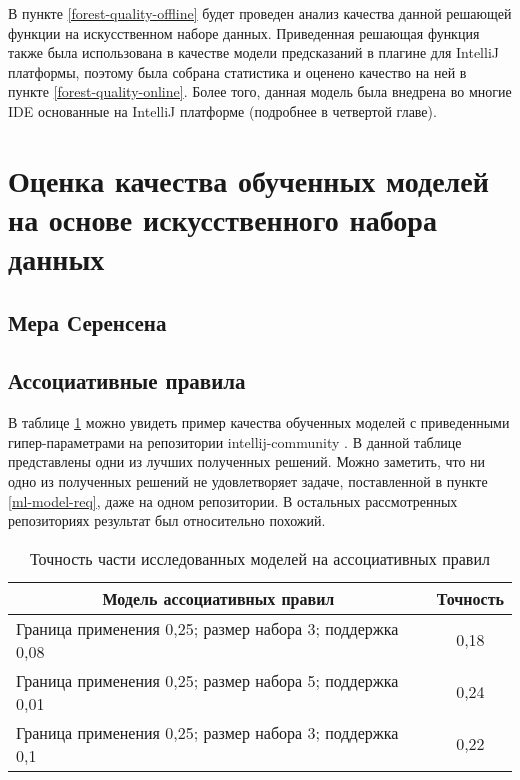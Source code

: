 В пункте \ref{forest-quality-offline} будет проведен анализ качества данной решающей функции на искусственном наборе данных. Приведенная решающая функция также была использована в качестве модели предсказаний в плагине для IntelliJ платформы, поэтому была собрана статистика и оценено качество на ней в пункте \ref{forest-quality-online}. Более того, данная модель была внедрена во многие IDE основанные на IntelliJ платформе (подробнее в четвертой главе).
\section{Оценка качества обученных моделей на основе искусственного набора данных}
    \subsection{Мера Серенсена}\label{coef-quality}
    \subsection{Ассоциативные правила}\label{rules-quality}
В таблице \ref{ar-offline-result-table} можно увидеть пример качества обученных моделей с приведенными гипер-параметрами на репозитории intellij-community \cite{ij-community}. В данной таблице представлены одни из лучших полученных решений. Можно заметить, что ни одно из полученных решений не удовлетворяет задаче, поставленной в пункте \ref{ml-model-req}, даже на одном репозитории. В остальных рассмотренных репозиториях результат был относительно похожий.
        \begin{table}[!h]
        \caption{Точность части исследованных моделей на ассоциативных правил}\label{ar-offline-result-table}
        \centering
        \begin{tabular}{|l|c|}\hline
        \multicolumn{1}{|c|}{\textbf{Модель ассоциативных правил}} & \textbf{Точность}\\\hline
        Граница применения 0,25; размер набора 3; поддержка 0,08 & 0,18\\\hline
        Граница применения 0,25; размер набора 5; поддержка 0,01  & 0,24 \\\hline
        Граница применения 0,25; размер набора 3; поддержка 0,1  & 0,22\\\hline
        \end{tabular}
        \end{table}
